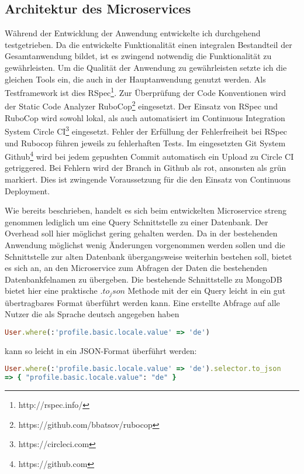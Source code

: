 \subsection{Architektur des Microservices}
Während der Entwicklung der Anwendung entwickelte ich durchgehend testgetrieben. Da die entwickelte Funktionalität einen integralen Bestandteil der Gesamtanwendung bildet, ist es zwingend notwendig die Funktionalität zu gewährleisten. Um die Qualität der Anwendung zu gewährleisten setzte ich die gleichen Tools ein, die auch in der Hauptanwendung genutzt werden. Als Testframework ist dies RSpec\footnote{http://rspec.info/}. Zur Überprüfung der Code Konventionen wird der Static Code Analyzer RuboCop\footnote{https://github.com/bbatsov/rubocop} eingesetzt. Der Einsatz von RSpec und RuboCop wird sowohl lokal, als auch automatisiert im Continuous Integration System Circle CI\footnote{https://circleci.com} eingesetzt. Fehler der Erfüllung der Fehlerfreiheit bei RSpec und Rubocop führen jeweils zu fehlerhaften Tests. Im eingesetzten Git System Github\footnote{https://github.com} wird bei jedem gepushten Commit automatisch ein Upload zu Circle CI getriggered. Bei Fehlern wird der Branch in Github als rot, ansonsten als grün markiert. Dies ist zwingende Voraussetzung für die den Einsatz von Continuous Deployment.

Wie bereits beschrieben, handelt es sich beim entwickelten Microservice streng genommen lediglich um eine Query Schnittstelle zu einer Datenbank. Der Overhead soll hier möglichst gering gehalten werden. Da in der bestehenden Anwendung möglichst wenig Änderungen vorgenommen werden sollen und die Schnittstelle zur alten Datenbank übergangsweise weiterhin bestehen soll, bietet es sich an, an den Microservice zum Abfragen der Daten die bestehenden Datenbankfelnamen zu übergeben. Die bestehende Schnittstelle zu MongoDB bietet hier eine praktische $.to_json$ Methode mit der ein Query leicht in ein gut übertragbares Format überführt werden kann. Eine erstellte Abfrage auf alle Nutzer die als Sprache deutsch angegeben haben

\begin{lstlisting}[language=Ruby]
User.where(:'profile.basic.locale.value' => 'de')
\end{lstlisting}

\noindent kann so leicht in ein JSON-Format überführt werden:

\begin{lstlisting}[language=Ruby]
User.where(:'profile.basic.locale.value' => 'de').selector.to_json
=> { "profile.basic.locale.value": "de" }
\end{lstlisting}

